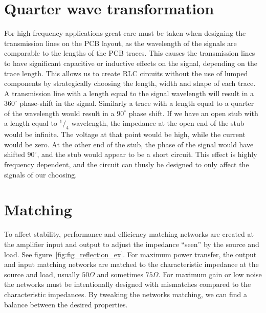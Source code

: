 \section{Quarter wave transformation}
For high frequency applications great care must be taken when designing the transmission lines on the PCB layout, as the wavelength of the signals are comparable to the lengths of the PCB traces. This causes the transmission lines to have significant capacitive or inductive effects on the signal, depending on the trace length. This allows us to create RLC circuits without the use of lumped components by strategically choosing the length, width and shape of each trace. A transmission line with a length equal to the signal wavelength will result in a $360^\circ$ phase-shift in the signal. Similarly a trace with a length equal to a quarter of the wavelength would result in a $90^\circ$ phase shift. If we have an open stub with a length equal to $^1/_4$ wavelength, the impedance at the open end of the stub would be infinite. The voltage at that point would be high, while the current would be zero. At the other end of the stub, the phase of the signal would have shifted  $90^\circ$, and the stub would appear to be a short circuit. This effect is highly frequency dependent, and the circuit can thusly be designed to only affect the signals of our choosing.
\section{Matching}
To affect stability, performance and efficiency matching networks are created at the amplifier input and output to adjust the impedance “seen” by the source and load. See figure~\ref{fig:fig_reflection_ex}. For maximum power transfer, the output and input matching networks are matched to the characteristic impedance at the source and load, usually $50\Omega$ and sometimes $75\Omega$. For maximum gain or low noise the networks must be intentionally designed with mismatches compared to the characteristic impedances. By tweaking the networks matching, we can find a balance between the desired properties.

